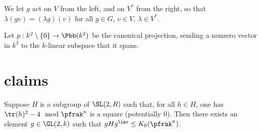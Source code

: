 \documentclass{book}
\begin{document}
We let $g$ act on $V$ from the left, and on $V^*$ from the right, so that $\lambda (g v) = (\lambda g)(v)$ for all $g\in G$, $v\in V$, $\lambda \in V^*$.



Let $p: k^2\setminus \{ 0 \} \to \Pbb(k^2)$ be the canonical projection, sending a nonzero vector in $k^2$ to the $k$-linear subspace that it spans.



\section*{claims}

\begin{proposition}
    Suppose $H$ is a subgroup of $\SL(2,R)$ such that, for all $h\in H$, one has $\tr(h)^2 - 4 \mod \pfrak^n$ is a square (potentially $0$). Then there exists an element $g \in \GL(2,k)$ such that $gHg^\inv \leq K_0(\pfrak^n)$.
\end{proposition}
\end{document}
